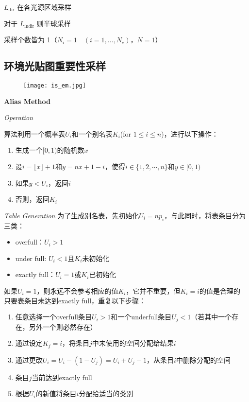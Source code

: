 \documentclass[14pt]{scrartcl} %
\begin{document}
$L_{\text{dir}}$ 在各光源区域采样

对于 $L_{\text{indir}}$ 则半球采样

采样个数皆为 1（$N_i=1\quad(i=1,\dots,N_e)$，$N=1$） 

\pagebreak

\subsection{环境光贴图重要性采样}
\begin{figure}[h] %
	\centering
	\texttt{[image: is\_em.jpg]} %
\end{figure}

\textbf{Alias Method}

\textit{Operation}

算法利用一个概率表$U_i$和一个别名表$K_i$(for $1\leq i\leq n$)，进行以下操作：

\begin{enumerate}
	\item 生成一个$[0,1)$的随机数$x$
	\item 设$i=\lfloor x \rfloor+1$和$y=nx+1-i$，使得$i\in \{1,2,\cdots,n\}$和$y\in[0,1)$
	\item 如果$y<U_i$，返回$i$
	\item 否则，返回$K_i$
\end{enumerate}

\textit{Table Generation}
为了生成别名表，先初始化$U_i=np_i$，与此同时，将表条目分为三类：
\begin{itemize}
	\item overfull：$U_i>1$
	\item under full: $U_i<1$且$K_i$未初始化
	\item exactly full：$U_i=1$或$K_i$已初始化
\end{itemize}

如果$U_i=1$，则永远不会参考相应的值$K_i$，它并不重要，但$K_i=i$的值是合理的
只要表条目未达到exactly full，重复以下步骤：
\begin{enumerate}
	\item 任意选择一个overfull条目$U_i>1$和一个underfull条目$U_j<1$（若其中一个存在，另外一个则必然存在）
	\item 通过设定$K_j=i$，将条目$j$中未使用的空间分配给结果$i$
	\item 通过更改$U_i=U_i-(1-U_j)=U_i+U_j-1$，从条目$i$中删除分配的空间
	\item 条目$j$当前达到exactly full
	\item 根据$U_i$的新值将条目$i$分配给适当的类别
\end{enumerate}
\end{document}
